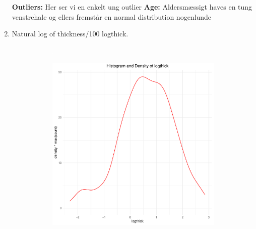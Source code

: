 \begin{enumerate}
\textbf{Outliers: }Her ser vi en enkelt ung outlier 
\textbf{Age: } Aldersmæssigt haves en tung venstrehale og ellers fremstår en normal distribution nogenlunde
\newpage
\item Natural log of thickness/100 logthick.
\newline
\begin{figure}[h]
    \centering
    \begin{subfigure}[b]{0.49\textwidth}
    \includegraphics[width=\textwidth]{Basses_kode/Billeder_duration/Boxplot_of_ logthick .pdf}
    \end{subfigure}
    \begin{subfigure}[b]{0.49\textwidth}
    \includegraphics[width=\textwidth]{Basses_kode/Billeder_duration/Histogram_and_Density_of_ logthick .pdf} 

\end{subfigure}
\end{figure}
\end{enumerate}
